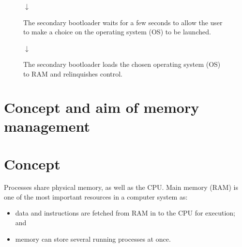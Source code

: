 \documentclass[a4paper]{systems-software}
\begin{document}
\begin{figure}[H]
{\begin{minipage}{0.6\dimexpr \textwidth-2\fboxsep-2\fboxrule}
	\begin{center}
		$\downarrow$
	\end{center}
	
	The secondary bootloader waits for a few seconds to allow the user to make a choice on the operating system (OS) to be launched.
	
	\begin{center}
		$\downarrow$
	\end{center}
	
	The secondary bootloader loads the chosen operating system (OS) to RAM and relinquishes control.
  \end{minipage}}
\end{figure}


\newpage

\section{Concept and aim of memory management}

\section*{Concept}

Processes share physical memory, as well as the CPU. Main memory (RAM) is one of the most important resources in a computer system as:
\begin{itemize}
	\item data and instructions are fetched from RAM in to the CPU for execution; and
	\item memory can store several running processes at once.
\end{itemize}
\end{document}
